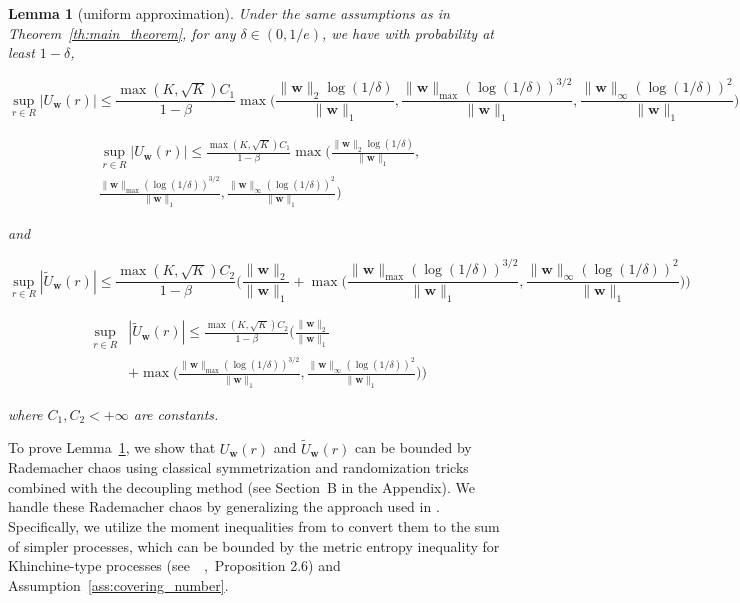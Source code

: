 \documentclass[letterpaper]{article} %
\def\DoubleColumn{}
\def\DoubleColumnEnd{}
\def\SingleColumn{}
\def\SingleColumnEnd{}
\newtheorem{lemma}{Lemma}
\newcommand{\weight}{\mathbf{w}}
\newcommand{\normo}[1]{\|#1\|_1}
\newcommand{\complexbound}{\beta}
\newcommand{\citep}[3]{(#1\ \citeauthor{#3}\ \citeyear{#3},\ #2)}
\begin{document}
\begin{lemma}[uniform approximation]
    \label{le:uniform_approximation}
    Under the same assumptions as in Theorem~\ref{th:main_theorem}, for any $\delta\in (0,1/e)$, we have with probability at least $1-\delta$,
    \SingleColumn
    \[\sup_{r\in R}|U_\weight{}(r)|\le \frac{\max(K,\sqrt{K})C_1}{1-\complexbound{}}\max\Big(\frac{\|\weight{}\|_2\log(1/\delta)}{\normo{\weight{}}},\frac{\|\weight{}\|_{\max}(\log(1/\delta))^{3/2}}{\normo{\weight{}}}, \frac{\|\weight{}\|_\infty(\log(1/\delta))^2}{\normo{\weight{}}}\Big)\]
    \SingleColumnEnd
    \DoubleColumn
    \begin{align*}
        \sup_{r\in R}|U_\weight{}(r)|\le \frac{\max(K,\sqrt{K})C_1}{1-\complexbound{}}\max\Big(\frac{\|\weight{}\|_2\log(1/\delta)}{\normo{\weight{}}},\\
        \frac{\|\weight{}\|_{\max}(\log(1/\delta))^{3/2}}{\normo{\weight{}}}, \frac{\|\weight{}\|_\infty(\log(1/\delta))^2}{\normo{\weight{}}}\Big)
    \end{align*}
    \DoubleColumnEnd
    and
    \SingleColumn
    \[\sup_{r\in R}|\widetilde{U}_\weight{}(r)|\le \frac{\max(K,\sqrt{K})C_2}{1-\complexbound{}}\Bigg(\frac{\|\weight{}\|_2}{\normo{\weight{}}}+\max\Big(\frac{\|\weight{}\|_{\max}(\log(1/\delta))^{3/2}}{\normo{\weight{}}},\frac{\|\weight{}\|_\infty(\log(1/\delta))^2}{\normo{\weight{}}}\Big)\Bigg)\]
    \SingleColumnEnd
    \DoubleColumn
    \begin{align*}
        \sup_{r\in R}&|\widetilde{U}_\weight{}(r)|\le \frac{\max(K,\sqrt{K})C_2}{1-\complexbound{}}\Bigg(\frac{\|\weight{}\|_2}{\normo{\weight{}}}\\
        &+\max\Big(\frac{\|\weight{}\|_{\max}(\log(1/\delta))^{3/2}}{\normo{\weight{}}},\frac{\|\weight{}\|_\infty(\log(1/\delta))^2}{\normo{\weight{}}}\Big)\Bigg)
    \end{align*}
    \DoubleColumnEnd
    where $C_1,C_2 < +\infty$ are constants.
\end{lemma}

To prove Lemma~\ref{le:uniform_approximation}, we show that $U_\weight{}(r)$ and $\widetilde{U}_\weight{}(r)$ can be bounded by Rademacher chaos using classical symmetrization and randomization tricks combined with the decoupling method (see Section~B in the Appendix). We handle these Rademacher chaos by generalizing the approach used in \cite{clemenccon2008ranking}. 
Specifically, we utilize the moment inequalities from \cite{Boucheron2005} to convert them to the sum of simpler processes, which can be bounded by the metric entropy inequality for Khinchine-type processes \citep{see}{Proposition 2.6}{Dembo1994} and Assumption~\ref{ass:covering_number}.
\end{document}
